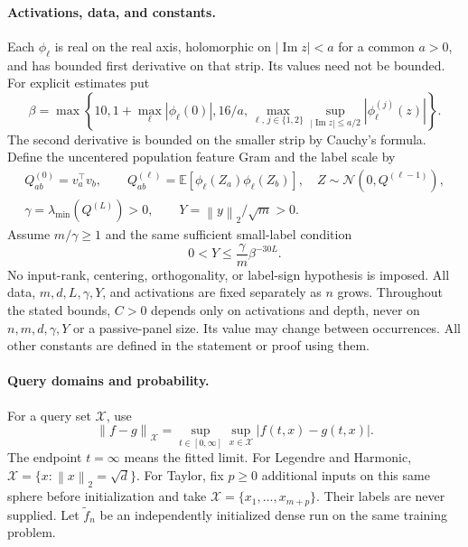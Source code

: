 \documentclass[11pt]{article}
\theoremstyle{definition}
\theoremstyle{remark}
\newcommand{\E}{\mathbb E}
\newcommand{\norm}[1]{\left\lVert#1\right\rVert}
\begin{document}
\paragraph{Activations, data, and constants.}
Each $\phi_\ell$ is real on the real axis, holomorphic on
$|\operatorname{Im}z|<a$ for a common $a>0$, and has bounded first derivative
on that strip. Its values need not be bounded. For explicit estimates put
\[
 \beta=\max\left\{10,1+\max_\ell|\phi_\ell(0)|,16/a,
 \max_{\ell,\,j\in\{1,2\}}
 \sup_{|\operatorname{Im}z|\le a/2}|\phi_\ell^{(j)}(z)|\right\}.
\]
The second derivative is bounded on the smaller strip by Cauchy's formula.
Define the uncentered population feature Gram and the label scale by
\begin{gather}
 Q^{(0)}_{ab}=v_a^\top v_b,\qquad
 Q^{(\ell)}_{ab}=\E[\phi_\ell(Z_a)\phi_\ell(Z_b)],\quad
 Z\sim\mathcal N(0,Q^{(\ell-1)}),\nonumber\\
 \gamma=\lambda_{\min}(Q^{(L)})>0,\qquad
 Y=\norm{y}_2/\sqrt m>0.
 \label{cp:data}
\end{gather}
Assume $m/\gamma\ge1$ and the same sufficient small-label condition
\begin{equation}
 0<Y\le\frac\gamma m\beta^{-30L}.
 \label{cp:labels}
\end{equation}
No input-rank, centering, orthogonality, or label-sign hypothesis is imposed.
All data, $m,d,L,\gamma,Y$, and activations are fixed separately as $n$ grows.
Throughout the stated bounds, $C>0$ depends only on activations and depth, never on
$n,m,d,\gamma,Y$ or a passive-panel size. Its value may change between occurrences.
All other constants are defined in the statement or proof using them.

\paragraph{Query domains and probability.}
For a query set $\mathcal X$, use
\begin{equation}
 \norm{f-g}_{\mathcal X}
   =\sup_{t\in[0,\infty]}\sup_{x\in\mathcal X}|f(t,x)-g(t,x)|.
 \label{cp:norm}
\end{equation}
The endpoint $t=\infty$ means the fitted limit. For Legendre and Harmonic,
$\mathcal X=\{x:\norm{x}_2=\sqrt d\}$. For Taylor, fix $p\ge0$
additional inputs on this same sphere before initialization and take
$\mathcal X=\{x_1,\ldots,x_{m+p}\}$. Their labels are never supplied.
Let $\widetilde f_n$ be an independently initialized dense run on the same
training problem.
\end{document}
